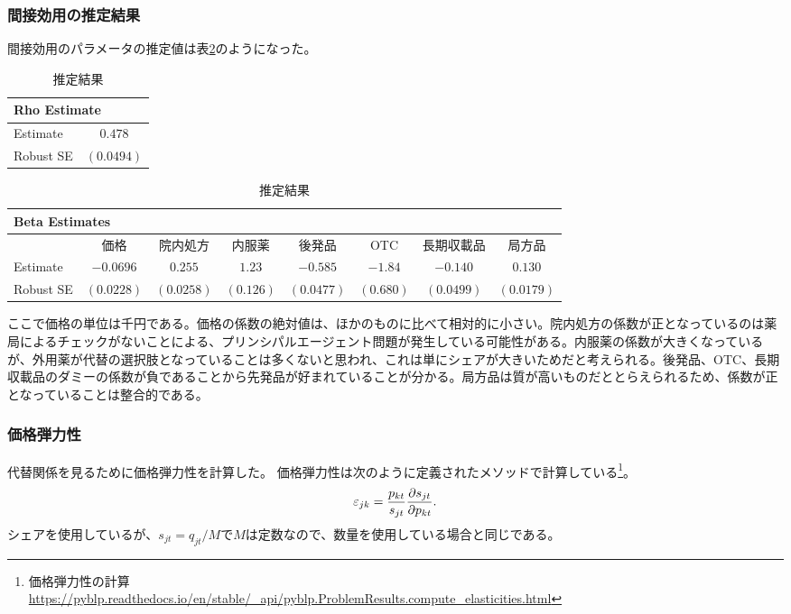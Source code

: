 \documentclass[a4paper,11pt,uplatex]{jsarticle}
\theoremstyle{definition}
\begin{document}
\subsubsection{間接効用の推定結果}
間接効用のパラメータの推定値は表\ref{indirect_utility}のようになった。
\begin{table}[H]
    \centering
    \footnotesize
    \caption{推定結果}\label{indirect_utility}
    \begin{tabular}{l c}
        \toprule
        \multicolumn{2}{l}{Rho Estimate} \\
        \midrule
        Estimate & $0.478$\\
        Robust SE & $(0.0494)$ \\
        \bottomrule
    \end{tabular}

    \vspace{1em}
    \footnotesize
    \begin{tabular}{lccccccc}
        \toprule
        \multicolumn{8}{l}{Beta Estimates} \\
        \midrule
        & 価格 & 院内処方 & 内服薬 & 後発品 & OTC & 長期収載品 & 局方品 \\
        \midrule
        Estimate & $-0.0696$ & $0.255$ & $1.23$ & $-0.585 $ & $-1.84 $ & $-0.140 $ & $0.130 $ \\
        Robust SE & $(0.0228 )$ & $(0.0258 )$ & $(0.126 )$ & $(0.0477)$ & $(0.680)$ & $(0.0499 )$ & $(0.0179 )$ \\
        \bottomrule
    \end{tabular}
\end{table}
ここで価格の単位は千円である。価格の係数の絶対値は、ほかのものに比べて相対的に小さい。院内処方の係数が正となっているのは薬局によるチェックがないことによる、プリンシパルエージェント問題が発生している可能性がある。内服薬の係数が大きくなっているが、外用薬が代替の選択肢となっていることは多くないと思われ、これは単にシェアが大きいためだと考えられる。後発品、OTC、長期収載品のダミーの係数が負であることから先発品が好まれていることが分かる。局方品は質が高いものだととらえられるため、係数が正となっていることは整合的である。
\subsubsection{価格弾力性}
代替関係を見るために価格弾力性を計算した。
価格弾力性は次のように定義されたメソッドで計算している\footnote{価格弾力性の計算\\\url{https://pyblp.readthedocs.io/en/stable/_api/pyblp.ProblemResults.compute_elasticities.html}}。
\begin{align*}
\varepsilon_{jk}=\frac{p_{kt}}{s_{jt}} \pdv{s_{jt}}{p_{kt}}.
\end{align*}
シェアを使用しているが、\(s_{jt}=q_{jt}/M\)で\(M\)は定数なので、数量を使用している場合と同じである。
\end{document}
